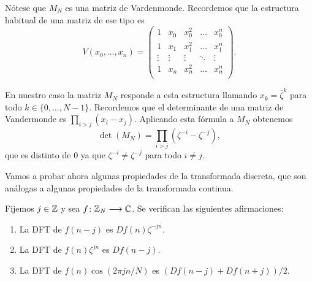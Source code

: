 \documentclass{article}
\begin{document}
Nótese que $M_N$ es una matriz de Vardenmonde. Recordemos que la estructura habitual de una matriz de ese tipo es
\[
V(x_{0},\dots,x_{n})=\begin{pmatrix}
1&x_{0}&x_{0}^{2}&\dots&x_{0}^{n} \\
1&x_{1}&x_{1}^{2}&\dots&x_{1}^{n} \\
\vdots&\vdots&\vdots&\ddots&\vdots\\
1&x_{n}&x_{n}^{2}&\dots&x_{n}^{n} \\
\end{pmatrix}.
\]

En nuestro caso la matriz $M_N$ responde a esta estructura llamando $x_k=\overline{\zeta}^k$ para todo $k \in \{0, \dots, N-1\}$.%
Recordemos que el determinante de una matriz de Vandermonde es $\prod_{i>j}(x_i-x_j)$. Aplicando esta fórmula a $M_N$ obtenemos
\[
\det(M_N)=\prod_{i>j}(\zeta^{-i}-\zeta^{-j}),
\]
que es distinto de $0$ ya que $\zeta^{-i} \ne \zeta^{-j}$ para todo $i \ne j$.

Vamos a probar ahora algunas propiedades de la transformada discreta, que son análogas a algunas propiedades de la transformada continua.
\begin{proposition} \label{prop:dft:prop}
Fijemos $j \in \mathbb{Z}$ y sea $f\colon\mathbb{Z}_N \longrightarrow \mathbb{C}$. Se verifican las siguientes afirmaciones:
\begin{enumerate}
    \item La DFT de $f(n-j)$ es $Df(n) \zeta^{-jn}$.
    \item La DFT de $f(n) \zeta^{jn}$ es $Df(n-j)$. \label{item:dft:b}
    \item La DFT de $f(n)\cos(2\pi jn/N)$ es $(Df(n-j)+Df(n+j)) / 2$.
\end{enumerate}
\end{proposition}
\end{document}

